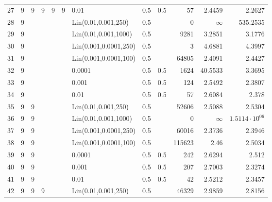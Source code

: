 \begin{longtable}{lrrrrrlrrrrr}
  27 &       9 & 9 & 9 & 9 & 9 &                  0.01 &  0.5 &    0.5 &      57 &                 2.4459 &                2.2627 \\
  28 &       9 &   &   &   &   &   Lin(0.01,0.001,250) &  0.5 &        &       0 &               $\infty$ &              535.2535 \\
  29 &       9 &   &   &   &   &  Lin(0.01,0.001,1000) &  0.5 &        &    9281 &                 3.2851 &                3.1776 \\
  30 &       9 &   &   &   &   & Lin(0.001,0.0001,250) &  0.5 &        &       3 &                 4.6881 &                4.3997 \\
  31 &       9 &   &   &   &   & Lin(0.001,0.0001,100) &  0.5 &        &   64805 &                 2.4091 &                2.4427 \\
  32 &       9 &   &   &   &   &                0.0001 &  0.5 &    0.5 &    1624 &                40.5533 &                3.3695 \\
  33 &       9 &   &   &   &   &                 0.001 &  0.5 &    0.5 &     124 &                 2.5492 &                2.3807 \\
  34 &       9 &   &   &   &   &                  0.01 &  0.5 &    0.5 &      57 &                 2.6084 &                 2.378 \\
  35 &       9 & 9 &   &   &   &   Lin(0.01,0.001,250) &  0.5 &        &   52606 &                 2.5088 &                2.5304 \\
  36 &       9 & 9 &   &   &   &  Lin(0.01,0.001,1000) &  0.5 &        &       0 &               $\infty$ & $1.5114\cdot 10^{06}$ \\
  37 &       9 & 9 &   &   &   & Lin(0.001,0.0001,250) &  0.5 &        &   60016 &                 2.3736 &                2.3946 \\
  38 &       9 & 9 &   &   &   & Lin(0.001,0.0001,100) &  0.5 &        &  115623 &                   2.46 &                2.5034 \\
  39 &       9 & 9 &   &   &   &                0.0001 &  0.5 &    0.5 &     242 &                 2.6294 &                 2.512 \\
  40 &       9 & 9 &   &   &   &                 0.001 &  0.5 &    0.5 &     207 &                 2.7003 &                2.3274 \\
  41 &       9 & 9 &   &   &   &                  0.01 &  0.5 &    0.5 &      42 &                 2.5212 &                2.3457 \\
  42 &       9 & 9 & 9 &   &   &   Lin(0.01,0.001,250) &  0.5 &        &   46329 &                 2.9859 &                2.8156 \\

\end{longtable}
